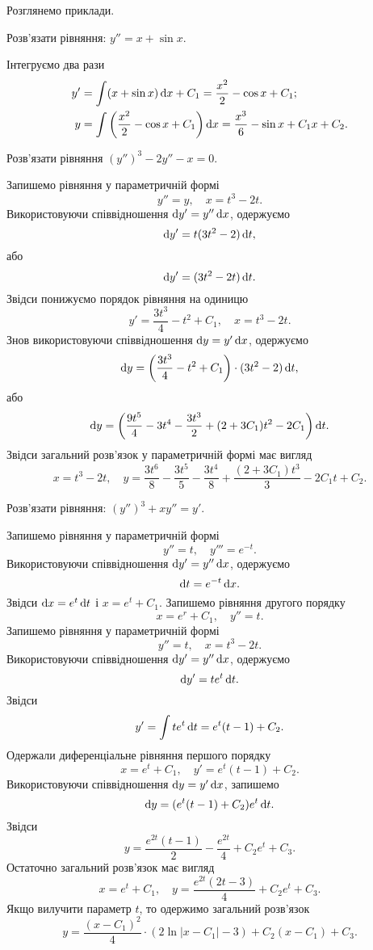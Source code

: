 Розглянемо приклади.
\begin{example}
	Розв’язати рівняння: $y'' = x + \sin x$.
\end{example}
\begin{solution}
	Інтегруємо два рази
	\begin{align*}
		y' &= \int (x + \sin x) \mathop{}\!\mathrm{d} x + C_1 = \frac{x^2}{2} - \cos x + C_1; \\
		y &= \int \left( \frac{x^2}{2} - \cos x + C_1 \right) \mathop{}\!\mathrm{d} x = \frac{x^3}{6} - \sin x + C_1 x+ C_2.
	\end{align*}
\end{solution}
\begin{example}
	Розв’язати рівняння $(y'')^3 - 2 y'' - x = 0$.
\end{example}
\begin{solution}
	Запишемо рівняння у параметричній формі \[ y'' = y, \quad x = t^3 - 2 t. \] Використовуючи співвідношення $\mathop{}\!\mathrm{d} y' = y'' \mathop{}\!\mathrm{d} x$, одержуємо \[ \mathop{}\!\mathrm{d} y' = t (3t^2 - 2) \mathop{}\!\mathrm{d} t,\] або \[ \mathop{}\!\mathrm{d} y' = (3t^2 - 2t) \mathop{}\!\mathrm{d} t.\] Звідси понижуємо порядок рівняння на одиницю \[ y' = \frac{3t^3}{4}-t^2+C_1, \quad x = t^3 - 2t.\] Знов використовуючи співвідношення $\mathop{}\!\mathrm{d} y = y' \mathop{}\!\mathrm{d} x$, одержуємо \[ \mathop{}\!\mathrm{d} y = \left( \frac{3t^3}{4}-t^2+C_1 \right) \cdot (3t^2 - 2) \mathop{}\!\mathrm{d} t,\] або \[ \mathop{}\!\mathrm{d} y = \left( \frac{9t^5}{4} - 3 t^4 - \frac{3t^3}{2} + (2 + 3 C_1) t^2 - 2 C_1 \right) \mathop{}\!\mathrm{d} t.\]	Звідси загальний розв’язок у параметричній формі має вигляд \[ x = t^3 - 2 t, \quad y = \frac{3t^6}{8} - \frac{3 t^5}{5} - \frac{3t^4}{8} + \frac{(2 + 3 C_1) t^3}{3} - 2 C_1 t + C_2.\]
\end{solution}
\begin{example}
	Розв’язати рівняння: $(y'')^3 + x y'' = y'$.
\end{example}
\begin{solution}
	Запишемо рівняння у параметричній формі \[ y'' = t, \quad y''' = e^{-t}. \] Використовуючи співвідношення $\mathop{}\!\mathrm{d} y' = y'' \mathop{}\!\mathrm{d} x$, одержуємо \[ \mathop{}\!\mathrm{d} t = e^{-t} \mathop{}\!\mathrm{d} x. \] Звідси $\mathop{}\!\mathrm{d} x = e^t \mathop{}\!\mathrm{d} t$ і $x = e^t + C_1$. Запишемо рівняння другого порядку \[ x = e^r + C_1, \quad y'' = t.\] Запишемо рівняння у параметричній формі \[ y'' = t, \quad x = t^3 - 2 t.\] Використовуючи співвідношення $\mathop{}\!\mathrm{d} y' = y'' \mathop{}\!\mathrm{d} x$, одержуємо \[ \mathop{}\!\mathrm{d} y' = t e^t \mathop{}\!\mathrm{d} t. \] Звідси \[y' = \int t e^t \mathop{}\!\mathrm{d} t = e^t (t - 1) + C_2.\] Одержали диференціальне рівняння першого порядку \[ x = e^t + C_1, \quad y' = e^t (t - 1) + C_2.\] Використовуючи співвідношення $\mathop{}\!\mathrm{d} y = y' \mathop{}\!\mathrm{d} x$, запишемо \[ \mathop{}\!\mathrm{d} y = (e^t (t - 1) + C_2) e^t \mathop{}\!\mathrm{d} t.\] Звідси \[ y = \frac{e^{2t}(t-1)}{2} - \frac{e^{2t}}{4} + C_2 e^t + C_3.\] Остаточно загальний розв’язок має вигляд \[ x = e^t + C_1, \quad y = \frac{e^{2t}(2t - 3)}{4}+C_2e^t + C_3.\] Якщо вилучити параметр $t$, то одержимо загальний розв’язок \[ y = \frac{(x-C_1)^2}{4} \cdot \left( 2 \ln |x - C_1| - 3 \right) + C_2 (x - C_1) + C_3.\]
\end{solution}
